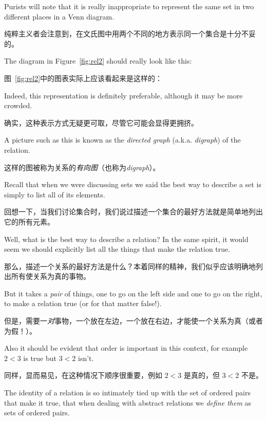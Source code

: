 Purists will note that it is really inappropriate to represent the same set
in two different places in a Venn diagram.

纯粹主义者会注意到，在文氏图中用两个不同的地方表示同一个集合是十分不妥的。

The diagram in Figure~\ref{fig:rel2}
should really look like this:

图~\ref{fig:rel2}中的图表实际上应该看起来是这样的：

\begin{center}

\end{center}

Indeed, this representation is definitely preferable, although it may be more crowded.

确实，这种表示方式无疑更可取，尽管它可能会显得更拥挤。

A picture such as this is
known as the \emph{directed graph} (a.k.a. \emph{digraph})
of the relation.

这样的图被称为关系的\emph{有向图}（也称为\emph{digraph}）。

Recall that when we were discussing sets we said the best way to describe 
a set is simply to list all of its elements.

回想一下，当我们讨论集合时，我们说过描述一个集合的最好方法就是简单地列出它的所有元素。

Well, what is the best
way to describe a relation?  In the same spirit, it would seem we should
explicitly list all the things that make the relation true.

那么，描述一个关系的最好方法是什么？本着同样的精神，我们似乎应该明确地列出所有使关系为真的事物。

But it takes
a \emph{pair} of things, one to go on the left side and one to go on the 
right, to make a relation true (or for that matter false!).

但是，需要一\emph{对}事物，一个放在左边，一个放在右边，才能使一个关系为真（或者为假！）。

Also it should 
be evident that order is important in this context, for example $2<3$ is true
but $3<2$ isn't.

同样，显而易见，在这种情况下顺序很重要，例如 $2<3$ 是真的，但 $3<2$ 不是。

The identity of a relation is so intimately tied up with
the set of ordered pairs that make it true, that when dealing with abstract
relations we \emph{define them} as sets of ordered pairs.

